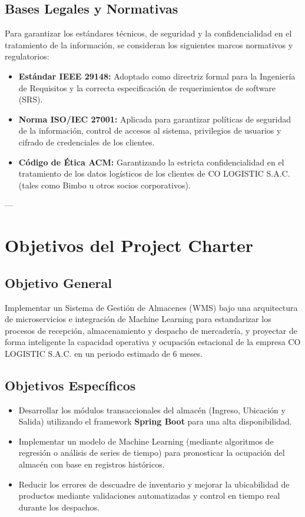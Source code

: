 \documentclass[11pt]{article}
\begin{document}
\subsection{Bases Legales y Normativas}
Para garantizar los estándares técnicos, de seguridad y la confidencialidad en el tratamiento de la información, se consideran los siguientes marcos normativos y regulatorios:
\begin{itemize}[label=\textbullet]
  \item \textbf{Estándar IEEE 29148:} Adoptado como directriz formal para la Ingeniería de Requisitos y la correcta especificación de requerimientos de software (SRS).
  \item \textbf{Norma ISO/IEC 27001:} Aplicada para garantizar políticas de seguridad de la información, control de accesos al sistema, privilegios de usuarios y cifrado de credenciales de los clientes.
  \item \textbf{Código de Ética ACM:} Garantizando la estricta confidencialidad en el tratamiento de los datos logísticos de los clientes de CO LOGISTIC S.A.C. (tales como Bimbo u otros socios corporativos).
\end{itemize}

---

\section{Objetivos del Project Charter}

\subsection{Objetivo General}
Implementar un Sistema de Gestión de Almacenes (WMS) bajo una arquitectura de microservicios e integración de Machine Learning para estandarizar los procesos de recepción, almacenamiento y despacho de mercadería, y proyectar de forma inteligente la capacidad operativa y ocupación estacional de la empresa CO LOGISTIC S.A.C. en un periodo estimado de 6 meses.

\subsection{Objetivos Específicos}
\begin{itemize}[label=\textbullet]
  \item Desarrollar los módulos transaccionales del almacén (Ingreso, Ubicación y Salida) utilizando el framework \textbf{Spring Boot} para una alta disponibilidad.
  \item Implementar un modelo de Machine Learning (mediante algoritmos de regresión o análisis de series de tiempo) para pronosticar la ocupación del almacén con base en registros históricos.
  \item Reducir los errores de descuadre de inventario y mejorar la ubicabilidad de productos mediante validaciones automatizadas y control en tiempo real durante los despachos.
\end{itemize}
\end{document}
